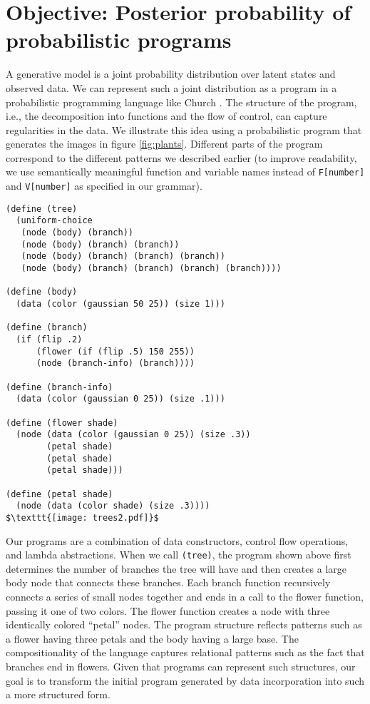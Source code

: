 \documentclass[a4paper,10pt]{article}
\begin{document}
\section{Objective: Posterior probability of probabilistic programs}
A generative model is a joint probability distribution over latent states and observed data. We can represent such a joint distribution as a program in a probabilistic programming language like Church \cite{N.D.Goodman:2008:f2a0d}. The structure of the program, i.e., the decomposition into functions and the flow of control, can capture regularities in the data. We illustrate this idea using a probabilistic program that generates the images in figure \ref{fig:plants}. Different parts of the program correspond to the different patterns we described earlier (to improve readability, we use semantically meaningful function and variable names instead of \texttt{F[number]} and \texttt{V[number]} as specified in our grammar).  
\begin{lstlisting}[mathescape=true]
(define (tree)
  (uniform-choice
   (node (body) (branch))
   (node (body) (branch) (branch))
   (node (body) (branch) (branch) (branch))
   (node (body) (branch) (branch) (branch) (branch))))

(define (body) 
  (data (color (gaussian 50 25)) (size 1)))

(define (branch)
  (if (flip .2) 
      (flower (if (flip .5) 150 255))
      (node (branch-info) (branch))))

(define (branch-info)
  (data (color (gaussian 0 25)) (size .1)))

(define (flower shade)
  (node (data (color (gaussian 0 25)) (size .3))
        (petal shade)
        (petal shade)
        (petal shade)))

(define (petal shade)
  (node (data (color shade) (size .3))))
$\texttt{[image: trees2.pdf]}$
\end{lstlisting}
Our programs are a combination of data constructors, control flow operations, and lambda abstractions.  When we call \texttt{(tree)}, the program shown above first determines the number of branches the tree will have and then creates a large body node that connects these branches.  Each branch function recursively connects a series of small nodes together and ends in a call to the flower function, passing it one of two colors.  The flower function creates a node with three identically colored ``petal'' nodes.  The program structure reflects patterns such as a flower having three petals and the body having a large base.  The compositionality of the language captures relational patterns such as the fact that branches end in flowers. Given that programs can represent such structures, our goal is to transform the initial program generated by data incorporation into such a more structured form.
\end{document}
